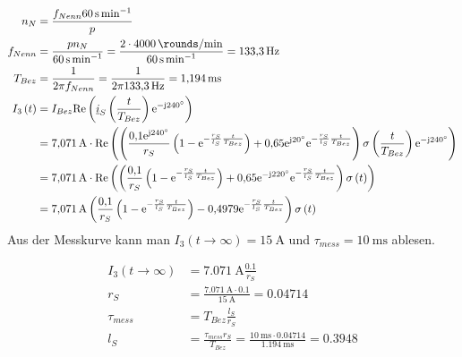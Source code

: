 \documentclass[11pt,a4paper]{scrartcl}
\newcommand{\mybr}[1]{\left(#1\right)}
\renewcommand{\j}{\mathrm{j}}
\renewcommand{\i}{\underline{i}}
\newcommand{\0}{_{\mybr{0}}}
\newcommand{\1}{_{\mybr{1}}}
\newcommand{\2}{_{\mybr{2}}}
\renewcommand{\e}{\mathrm{e}}
\renewcommand{\Re}{\mathrm{Re}}
\begin{document}
\section{}
\begin{align}
n_N&=\frac{f_{Nenn}\SI{60}{\second\per\minute}}{p}\\
f_{Nenn}&=\frac{p n_N}{\SI{60}{\second\per\minute}}=\frac{2\cdot\SI{4000}{\rounds\per\minute}}{\SI{60}{\second\per\minute}}=\SI{133.3}{\hertz}\\
T_{Bez}&=\frac{1}{2\pi f_{Nenn}}=\frac{1}{2\pi\SI{133.3}{\hertz}}=\SI{1.194}{\milli\second}\\
I_3\mybr{t}&=I_{Bez}\Re\mybr{\i_S\mybr{\frac{t}{T_{Bez}}}\e^{-\j\SI{240}{\degree}}}\\
&=\SI{7.071}{\ampere}\cdot\Re\mybr{\mybr{\frac{\num{0.1}\e^{\j\SI{240}{\degree}}}{r_S}\mybr{1-\e^{-\frac{r_S}{l_S}\frac{t}{T_{Bez}}}}+\num{0.65}\e^{\j\SI{20}{\degree}}\e^{-\frac{r_S}{l_S}\frac{t}{T_{Bez}}}}\sigma\mybr{\frac{t}{T_{Bez}}}\e^{-\j\SI{240}{\degree}}}\\
&=\SI{7.071}{\ampere}\cdot\Re\mybr{\mybr{\frac{\num{0.1}}{r_S}\mybr{1-\e^{-\frac{r_S}{l_S}\frac{t}{T_{Bez}}}}+\num{0.65}\e^{-\j\SI{220}{\degree}}\e^{-\frac{r_S}{l_S}\frac{t}{T_{Bez}}}}\sigma\mybr{t}}\\
&=\SI{7.071}{\ampere}\mybr{\frac{\num{0.1}}{r_S}\mybr{1-\e^{-\frac{r_S}{l_S}\frac{t}{T_{Bez}}}}-\num{0.4979}\e^{-\frac{r_S}{l_S}\frac{t}{T_{Bez}}}}\sigma\mybr{t}\\
\end{align}
Aus der Messkurve kann man $I_3\mybr{t\rightarrow\infty}=\SI{15}{\ampere}$ und $\tau_{mess}=\SI{10}{\milli\second}$ ablesen.
\begin{figure*}[!htbp]
	\centering
\end{figure*}
\begin{align}
I_3\mybr{t\rightarrow\infty}&=\SI{7.071}{\ampere}\frac{\num{0.1}}{r_S}\\
r_S&=\frac{\SI{7.071}{\ampere}\cdot\num{0.1}}{\SI{15}{\ampere}}=\num{0.04714}\\
\tau_{mess}&=T_{Bez}\frac{l_S}{r_S}\\
l_S&=\frac{\tau_{mess}r_S}{T_{Bez}}=\frac{\SI{10}{\milli\second}\cdot\num{0.04714}}{\SI{1.194}{\milli\second}}=\num{0.3948}
\end{align}
\end{document}
